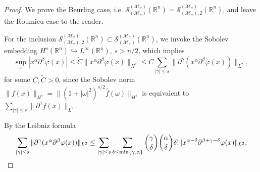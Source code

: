 \documentclass{article}
\theoremstyle{thmstyleone}
\theoremstyle{thmstyletwo}%
\theoremstyle{thmstylethree}%
\begin{document}
\begin{proof} 
We prove the Beurling case, i.e.
$ \mathcal S_{(\mathcal{M}_\sigma ) }^{ (\mathcal{M}_\sigma)} (\mathbb R^n)
= \mathcal S_{(\mathcal{M}_\sigma ),2 }^{ (\mathcal{M}_\sigma )} (\mathbb R^n)$,
and leave the Roumieu case to the reader.

For the inclusion 
$ \mathcal S_{(\mathcal{M}_\sigma ),2 }^{ (\mathcal{M}_\sigma )} (\mathbb R^n) 
\subset \mathcal S_{(\mathcal{M}_\sigma ) }^{ (\mathcal{M}_\sigma)} (\mathbb R^n)
$, we invoke the Sobolev embedding 
$ H^s (\mathbb R^n) \hookrightarrow L^\infty (\mathbb R^n)$, $s> n/2$,
which implies
\begin{equation} \label{eq:sobolev-emb}
\sup_{x} |x^\alpha \partial^\beta \varphi(x)|\leq
\tilde C \| x^\alpha \partial^\beta \varphi(x) \|_{H^s} \leq
C \sum_{|\gamma| \leq s} \| \partial^\gamma (x^\alpha \partial^\beta \varphi(x) )\|_{L^2},
\end{equation}
for some $C, \tilde C >0$,
since the Sobolev norm
$\| f(x) \|_{H^s} = \| (1+|\omega|^2)^{s/2} \hat f(\omega) \|_{H^s}
$
is equivalent to
$ \sum_{|\gamma| \leq s} \| \partial^\gamma f(x)\|_{L^2}$.

\par

By the Leibniz formula 
\begin{equation} \label{eq:several-terms}
\sum_{|\gamma| \leq s} \|\partial^\gamma (x^\alpha \partial^\beta \varphi(x) )\|_{L^2}  \leq
\sum_{|\gamma| \leq s}
\sum_{\delta \leq \min \{ \gamma, \alpha \}}  
\binom{\gamma}{\delta} \binom{\alpha}{\delta} \delta!
\| x^{\alpha - \delta} \partial ^{\beta + \gamma - \delta}  \varphi(x)\|_{L^2}. \\
\end{equation}


\end{proof}
\end{document}
